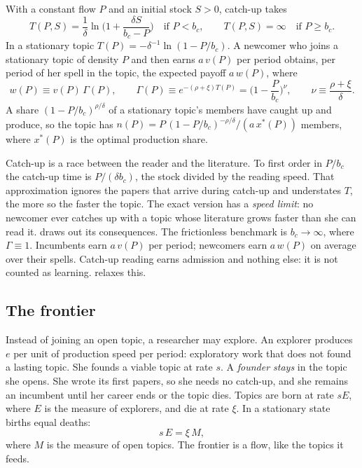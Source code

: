 \begin{lemma}\label{lem:career}
With a constant flow $P$ and an initial stock $S>0$, catch-up takes
\begin{equation}\label{eq:T}
T(P,S)=\frac1\delta\ln\Big(1+\frac{\delta S}{b_c-P}\Big)\quad\text{if }P<b_c,\qquad T(P,S)=\infty\quad\text{if }P\ge b_c.
\end{equation}
In a stationary topic $T(P)=-\delta^{-1}\ln(1-P/b_c)$. A newcomer who joins a
stationary topic of density $P$ and then earns $a\,v(P)$ per period obtains,
per period of her spell in the topic, the expected payoff $a\,w(P)$, where
\begin{equation}\label{eq:w}
w(P)\equiv v(P)\,\Gamma(P),\qquad \Gamma(P)\equiv e^{-(\rho+\xi)T(P)}=\Big(1-\frac P{b_c}\Big)^{\nu},\qquad \nu\equiv\frac{\rho+\xi}\delta .
\end{equation}
A share $(1-P/b_c)^{\rho/\delta}$ of a stationary topic's members have caught
up and produce, so the topic has $n(P)=P\,(1-P/b_c)^{-\rho/\delta}/(a\,x^*(P))$
members, where $x^*(P)$ is the optimal production share.
\end{lemma}

Catch-up is a race between the reader and the literature. To first order in
$P/b_c$ the catch-up time is $P/(\delta b_c)$, the stock divided by the
reading speed. That approximation ignores the papers that arrive during
catch-up and understates $T$, the more so the faster the topic. The exact
version has a \emph{speed limit}: no newcomer ever catches up with a topic
whose literature grows faster than she can read it.  draws
out its consequences. The frictionless benchmark is $b_c\to\infty$, where
$\Gamma\equiv1$. Incumbents earn $a\,v(P)$ per period; newcomers earn $a\,w(P)$
on average over their spells. Catch-up reading earns admission and nothing
else: it is not counted as learning.  relaxes this.

\subsection{The frontier}\label{sec:frontier}

Instead of joining an open topic, a researcher may explore. An explorer
produces $e$ per unit of production speed per period: exploratory work that
does not found a lasting topic. She founds a viable topic at rate $s$. A
\emph{founder stays} in the topic she opens. She wrote its first papers, so she
needs no catch-up, and she remains an incumbent until her career ends or the
topic dies. Topics are born at rate $sE$, where $E$ is the measure of
explorers, and die at rate $\xi$. In a stationary state births equal deaths:
\begin{equation}\label{eq:births}
s\,E=\xi\,M,
\end{equation}
where $M$ is the measure of open topics. The frontier is a flow, like the
topics it feeds.

